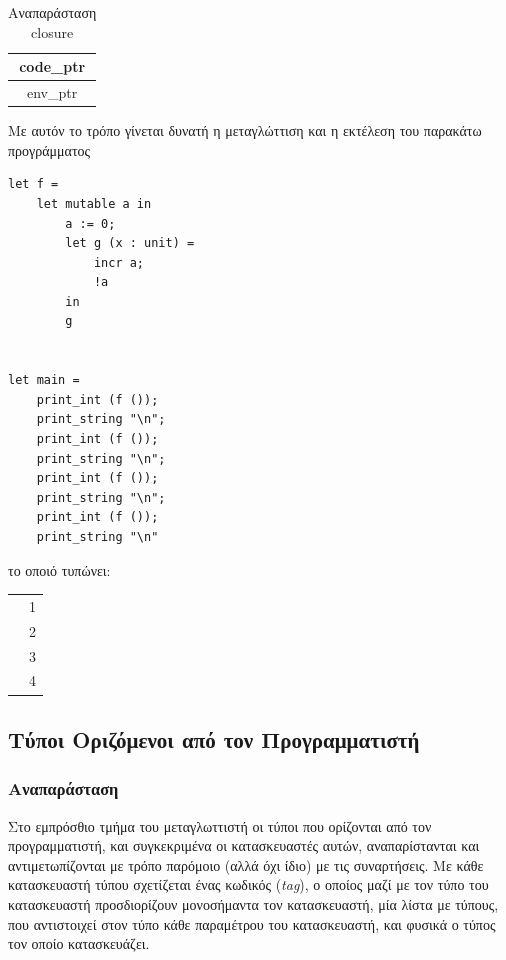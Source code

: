 \documentclass[12pt]{article}
\begin{document}
\begin{table}[htbp]
\centering
    \begin{tabular}{|c|}
    \hline
    code\_ptr \\ \hline
    env\_ptr  \\ \hline
    \end{tabular}
    \caption{Αναπαράσταση closure}
\end{table}


Με αυτόν το τρόπο γίνεται δυνατή η μεταγλώττιση και η εκτέλεση του παρακάτω προγράμματος

\begin{verbatim}
let f = 
    let mutable a in
        a := 0;
        let g (x : unit) =
            incr a;
            !a
        in
        g


let main = 
    print_int (f ());
    print_string "\n";
    print_int (f ());
    print_string "\n";
    print_int (f ());
    print_string "\n";
    print_int (f ()); 
    print_string "\n"
\end{verbatim}

το οποιό τυπώνει: \\

\begin{tabular}{r r}
& 1 \\
& 2 \\
& 3 \\
& 4 \\
\end{tabular}


\subsection{Τύποι Οριζόμενοι από τον Προγραμματιστή}
\subsubsection{Αναπαράσταση}
Στο εμπρόσθιο τμήμα του μεταγλωττιστή οι τύποι που ορίζονται από τον προγραμματιστή, και συγκεκριμένα οι κατασκευαστές αυτών, αναπαρίστανται και αντιμετωπίζονται με τρόπο παρόμοιο (αλλά όχι ίδιο) με τις συναρτήσεις. Με κάθε κατασκευαστή τύπου σχετίζεται ένας κωδικός (\textit{tag}), ο οποίος μαζί με τον τύπο του κατασκευαστή προσδιορίζουν μονοσήμαντα τον κατασκευαστή, μία λίστα με τύπους, που αντιστοιχεί στον τύπο κάθε παραμέτρου του κατασκευαστή, και φυσικά ο τύπος τον οποίο κατασκευάζει. 
\end{document}
